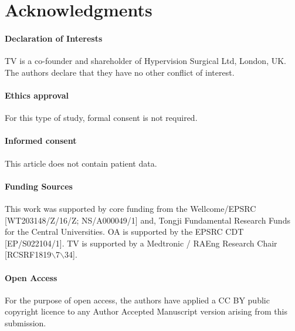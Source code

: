 \documentclass[times,twocolumn,final]{elsarticle}
\begin{document}
\section*{Acknowledgments}
\paragraph{Declaration of Interests}
TV is a co-founder and shareholder of Hypervision Surgical Ltd, London, UK.
The authors declare that they have no other conflict of interest.

\paragraph{Ethics approval} For this type of study, formal consent is not required.

\paragraph{Informed consent} This article does not contain patient data.

\paragraph{Funding Sources} This work was supported by core funding from the Wellcome/EPSRC [WT203148/Z/16/Z; NS/A000049/1] and, Tongji Fundamental Research Funds for the Central Universities. OA is supported by the EPSRC CDT
[EP/S022104/1].
TV is supported by a Medtronic / RAEng Research Chair [RCSRF1819$\backslash$7$\backslash$34].

\paragraph{Open Access} For the purpose of open access, the authors have applied a CC BY public copyright licence to any Author Accepted Manuscript version arising from this submission.


\ifdefined\ThesisChapterMode
\else
{}

\end{document}
